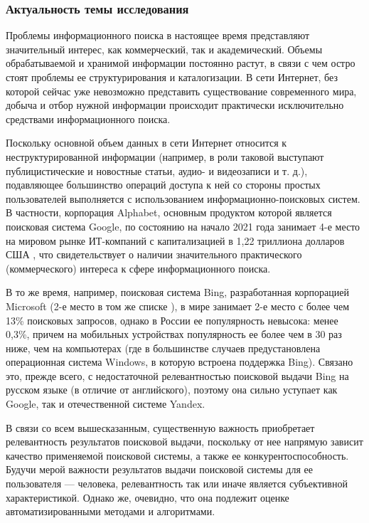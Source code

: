 \subsubsection{Актуальность темы исследования}
Проблемы информационного поиска в настоящее время представляют значительный интерес, как коммерческий, так и академический. Объемы обрабатываемой
и хранимой информации постоянно растут, в связи с чем остро стоят проблемы ее структурирования и каталогизации. В сети Интернет, без которой сейчас
уже невозможно представить существование современного мира, добыча и отбор нужной информации происходит практически исключительно средствами
информационного поиска.

Поскольку основной объем данных в сети Интернет относится к неструктурированной информации (например, в роли таковой выступают
публицистические и новостные статьи, аудио- и видеозаписи и т. д.), подавляющее большинство операций доступа к ней со стороны
простых пользователей выполняется с использованием информационно-поисковых систем. В частности, корпорация Alphabet, основным
продуктом которой является поисковая система Google, по состоянию на начало 2021 года занимает 4-е место на мировом рынке
ИТ-компаний с капитализацией в 1,22 триллиона долларов США \cite{forbestop100it}, что свидетельствует о наличии значительного
практического (коммерческого) интереса к сфере информационного поиска.

В то же время, например, поисковая система Bing, разработанная корпорацией Microsoft (2-е место в том же списке \cite{forbestop100it}),
в мире занимает 2-е место с более чем 13\% поисковых запросов, однако в России ее популярность невысока: менее 0,3\%, причем
на мобильных устройствах популярность ее более чем в 30 раз ниже, чем на компьютерах \cite{drmax2020} (где в большинстве
случаев предустановлена операционная система Windows, в которую встроена поддержка Bing). Связано это, прежде всего, с
недостаточной релевантностью поисковой выдачи Bing на русском языке (в отличие от английского), поэтому она сильно уступает
как Google, так и отечественной системе Yandex.

В связи со всем вышесказанным, существенную важность приобретает релевантность результатов поисковой выдачи, поскольку от нее напрямую зависит
качество применяемой поисковой системы, а также ее конкурентоспособность. Будучи мерой важности результатов выдачи поисковой системы для
ее пользователя --- человека, релевантность так или иначе является субъективной характеристикой. Однако же, очевидно, что она подлежит оценке
автоматизированными методами и алгоритмами.

